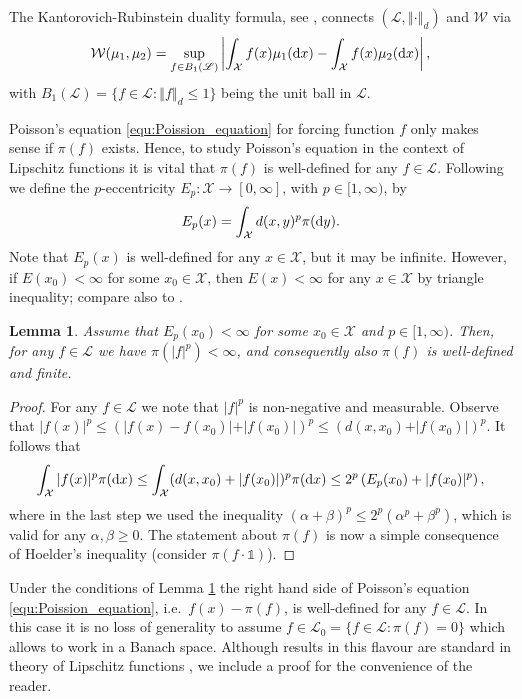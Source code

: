 \documentclass[12pt]{article}
\theoremstyle{plain}
\newtheorem{lem}[thm]{Lemma}
\renewcommand{\d}{{\rm d}}
\newcommand{\norm}[1]{\left\Vert #1 \right\Vert}
\newcommand{\cX}{\mathcal{X}}
\begin{document}
{The Kantorovich-Rubinstein duality formula, see \cite[Chapter 5]{villani2009optimal}, connects $(\mathscr{L}, \norm{\cdot}_d)$ and $\mathcal{W}$ via 
\[
\mathcal{W}(\mu_1, \mu_2) = \sup_{f \in B_1(\mathscr{L})} \left\vert \int_\cX f(x) \mu_1(\d x) - \int_\cX f(x) \mu_2(\d x) \right\vert,
\]
with $B_1(\mathscr{L}) = \{f \in \mathscr{L} \colon \norm{f}_d \leq 1\}$ being the unit ball in $\mathscr{L}$.


Poisson's equation \eqref{equ:Poission_equation} for forcing function $f$ only makes sense if $\pi(f)$ exists. 
Hence, to study Poisson's equation in the context of Lipschitz functions it is vital that $\pi(f)$ is well-defined for any $f \in \mathscr{L}$.
Following \cite{Joulin2010Curvature} we define the $p$-eccentricity $E_p \colon \cX \to [0,\infty]$, with $p\in [1, \infty)$, by
\[
E_p(x) = \int_\cX d(x,y)^p \pi(\d y).
\]
Note that $E_p(x)$ is well-defined for any $x \in \cX$, but it may be infinite. 
However, if $E(x_0)< \infty$ for some $x_0 \in \cX$, then $E(x)<\infty$ for any $x \in \cX$ by triangle inequality; compare also to \cite{Joulin2010Curvature}.
\begin{lem}\label{lem:integrability_Lipschitz}
Assume that $E_p(x_0)< \infty$ for some $x_0 \in \cX$ and $p \in [1, \infty)$. Then, for any $f \in \mathscr{L}$ we have $\pi(\vert f \vert^p ) < \infty$, and consequently also $\pi(f)$ is well-defined and finite.
\end{lem}

\begin{proof}
For any $f \in \mathscr{L}$ we note that $\vert f \vert^p $ is non-negative and measurable. Observe that $\vert f(x) \vert^p \leq (\vert f(x)- f(x_0) \vert + \vert f(x_0) \vert)^p \leq (d(x,x_0) + \vert f(x_0)\vert)^p$.  
It follows that 
\[
\int_\cX \vert f(x) \vert^p \pi(\d x) \leq  \int_\cX (d(x, x_0) + \vert f(x_0) \vert)^p \pi(\d x)
\leq 2^p\left(  E_p(x_0) + \vert f(x_0) \vert^p\right),
\]
where in the last step we used the inequality $(\alpha+\beta)^p \leq 2^p (\alpha^p+\beta^p)$, which is valid for any $\alpha, \beta \geq 0$.
The statement about $\pi(f)$ is now a simple consequence of Hoelder's inequality (consider $\pi(f \cdot \mathds{1})$).
\end{proof}

Under the conditions of Lemma \ref{lem:integrability_Lipschitz} the right hand side of Poisson's equation \eqref{equ:Poission_equation}, i.e.~$f(x)-\pi(f)$, is well-defined for any $f \in \mathscr{L}$. 
In this case it is no loss of generality to assume $ f \in \mathscr{L}_0 = \{f \in \mathscr{L} \colon \pi(f)=0\}$ which allows to work in a Banach space. 
Although results in this flavour are standard in theory of Lipschitz functions \cite{cobzacs2019lipschitz}, we include a proof for the convenience of the reader. 

}
\end{document}
